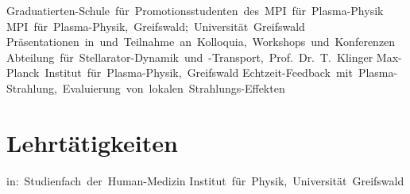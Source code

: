\documentclass[11pt,a4paper]{moderncv}
\begin{document}
        {Graduatierten-Schule~für~Promotionsstudenten~des~MPI~für~Plasma-Physik\newline}{}%
        {MPI~für~Plasma-Physik,~Greifswald;~Universität~Greifswald\newline}%
        {Präsentationen~in~und~Teilnahme~an~Kolloquia,~Workshops~und~Konferenzen}
        {Abteilung~für~Stellarator-Dynamik~und~-Transport,~Prof.~Dr.~T.~Klinger\newline}{}%
        {Max-Planck~Institut~für~Plasma-Physik,~Greifswald\newline}%
        {Echtzeit-Feedback~mit~Plasma-Strahlung,~Evaluierung~von~lokalen~Strahlungs-Effekten}

    \section{Lehrtätigkeiten}
        {in:~Studienfach~der~Human-Medizin\newline}{}%
        {Institut~für~Physik,~Universität~Greifswald}{}

\end{document}

